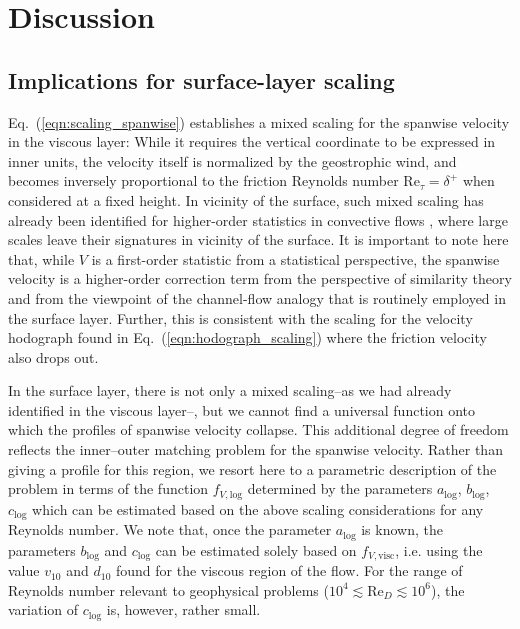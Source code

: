 \documentclass[smallcondensed,final]{svjour3}
\newcommand{\RE}{\mathrm{Re}}
\begin{document}
\section{Discussion}
\subsection{Implications for surface-layer scaling} 
Eq.~(\ref{eqn:scaling_spanwise}) establishes a mixed scaling for the spanwise velocity in the viscous layer:
%
While it requires the vertical coordinate to be expressed in inner units, the velocity itself is normalized by the geostrophic wind, and becomes inversely proportional to the friction Reynolds number $\RE_\tau=\delta^+$ when considered at a fixed height.
%
In vicinity of the surface, such mixed scaling has already been identified for higher-order statistics in convective flows \citep{mellado:BM2016,li:JAS2018}, where large scales leave their signatures in vicinity of the surface.
%
It is important to note here that, while $V$ is a first-order statistic from a statistical perspective, the spanwise velocity is a higher-order correction term from the perspective of similarity theory and from the viewpoint of the channel-flow analogy that is routinely employed in the surface layer.
%
Further, this is consistent with the scaling for the velocity hodograph found in Eq.~(\ref{eqn:hodograph_scaling}) where the friction velocity also drops out.
%
\par
%
In the surface layer, there is not only a mixed scaling--as we had already identified in the viscous layer--, but we cannot find a universal function onto which the profiles of spanwise velocity collapse. 
%
This additional degree of freedom reflects the inner--outer matching problem for the spanwise velocity. 
%
Rather than giving a profile for this region, we resort here to a parametric description of the problem in terms of the function $f_{V,\mathrm{log}}$ determined by the parameters $a_\mathrm{log}$, $b_\mathrm{log}$, $c_\mathrm{log}$ which can be estimated based on the above scaling considerations for any Reynolds number.
%
We note that, once the parameter $a_\mathrm{log}$ is known, the parameters $b_\mathrm{log}$ and $c_\mathrm{log}$ can be estimated solely based on $f_{V,\mathrm{visc}}$, i.e. using the value $v_{10}$ and $d_{10}$ found for the viscous region of the flow.
%
For the range of Reynolds number relevant to geophysical problems ($10^4\lesssim \RE_D \lesssim 10^6$), the variation of $c_\mathrm{log}$ is, however, rather small.
\end{document}
